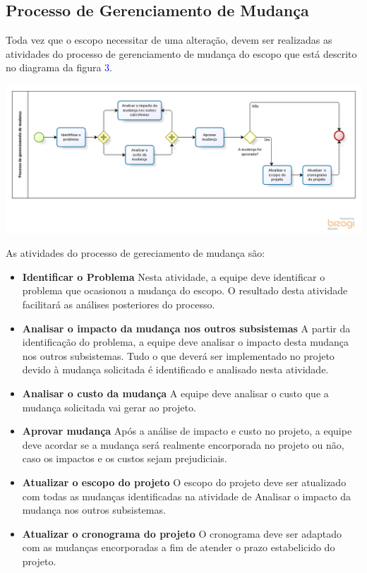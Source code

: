 \subsection{Processo de Gerenciamento de Mudança}

Toda vez que o escopo necessitar de uma alteração, devem ser realizadas as atividades do processo de gerenciamento de mudança do escopo que está descrito no diagrama da figura \textcolor{blue}{3}.

\begin{center}
	\includegraphics[scale=0.5]{figuras/mudancapi2}
\end{center} 

As atividades do processo de gereciamento de mudança são:
 
\begin{itemize}

\item \textbf{Identificar o Problema}
Nesta atividade, a equipe deve identificar o problema que ocasionou a mudança do escopo. O resultado desta atividade facilitará as análises posteriores do processo.

\item \textbf{Analisar o impacto da mudança nos outros subsistemas}
A partir da identificação do problema, a equipe deve analisar o impacto desta mudança nos outros subsistemas. Tudo o que deverá ser implementado no projeto devido à mudança solicitada é identificado e analisado nesta atividade.

\item \textbf{Analisar o custo da mudança}
A equipe deve analisar o custo que a mudança solicitada vai gerar ao projeto.

\item\textbf{ Aprovar mudança}
Após a análise de impacto e custo no projeto, a equipe deve acordar se a mudança será realmente encorporada no projeto ou não, caso os impactos e os custos sejam prejudiciais.

\item \textbf{Atualizar o escopo do projeto}
O escopo do projeto deve ser atualizado com todas as mudanças identificadas na atividade de Analisar o impacto da mudança nos outros subsistemas.

\item \textbf{Atualizar o cronograma do projeto}
O cronograma deve ser adaptado com as mudanças encorporadas a fim de atender o prazo estabelicido do projeto.

\end{itemize}

